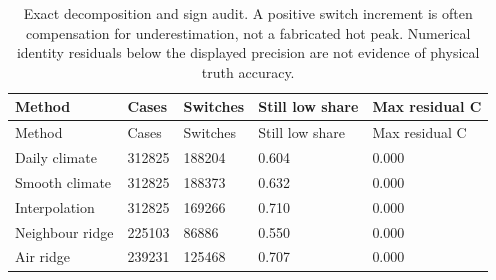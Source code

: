 {\tabletext
\setlength{\tabcolsep}{3pt}
\begin{longtable}{p{}p{}p{}p{}p{}}
\caption{Exact decomposition and sign audit. A positive switch increment is often compensation for underestimation, not a fabricated hot peak. Numerical identity residuals below the displayed precision are not evidence of physical truth accuracy.}\label{tab:r3si-identity}\\
\toprule
Method & Cases & Switches & Still low share & Max residual C \\
\midrule
\endfirsthead
\toprule
Method & Cases & Switches & Still low share & Max residual C \\
\midrule
\endhead
Daily climate & 312825 & 188204 & 0.604 & 0.000 \\
Smooth climate & 312825 & 188373 & 0.632 & 0.000 \\
Interpolation & 312825 & 169266 & 0.710 & 0.000 \\
Neighbour ridge & 225103 & 86886 & 0.550 & 0.000 \\
Air ridge & 239231 & 125468 & 0.707 & 0.000 \\
\bottomrule
\end{longtable}
}

